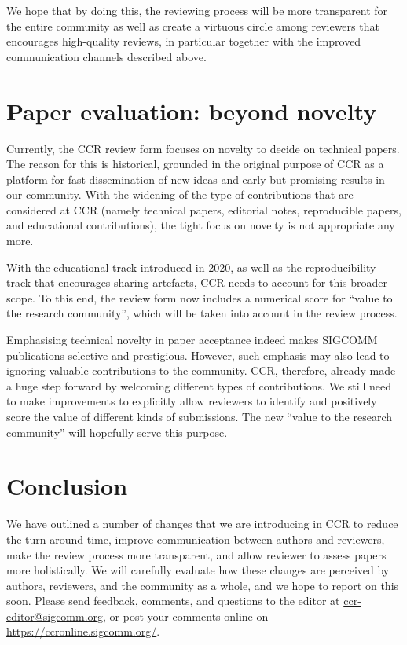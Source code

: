\documentclass[sigconf]{acmart}
\begin{document}
We hope that by doing this, the reviewing process will be more transparent for the entire community as well as create a virtuous circle among reviewers that encourages high-quality reviews, in particular together with the improved communication channels described above.

\section{Paper evaluation: beyond novelty}
\label{sec:value}

Currently, the CCR review form focuses on novelty to decide on technical
papers. The reason for this is historical, grounded in the original purpose of CCR as a platform for fast dissemination of new ideas and early but promising results in our community. With the widening of the type of contributions that are considered at CCR (namely technical papers, editorial notes, reproducible papers, and educational contributions), the tight focus on novelty is not appropriate any more. 

With the educational track introduced in 2020, as well as the reproducibility track that encourages sharing artefacts, CCR needs to account for this broader scope. To this end, the review form now includes a numerical score for ``value to the research community'', which will be taken into account in the review process.

Emphasising technical novelty in paper acceptance indeed makes SIGCOMM publications selective and prestigious. However, such emphasis may also lead to ignoring valuable contributions to the community. CCR, therefore, already made a huge step forward by welcoming different types of contributions. We still need to make improvements to explicitly allow reviewers to identify and positively score the value of different kinds of submissions. The new ``value to the research community'' will hopefully serve this purpose.

\section{Conclusion}

We have outlined a number of changes that we are introducing in CCR to reduce the turn-around time, improve communication between authors and reviewers, make the review process more transparent, and allow reviewer to assess papers more holistically. We will carefully evaluate how these changes are perceived by authors, reviewers, and the community as a whole, and we hope to report on this soon. Please send feedback, comments, and questions to the editor at \url{ccr-editor@sigcomm.org}, or post your comments online on \url{https://ccronline.sigcomm.org/}.       
    
\end{document}
